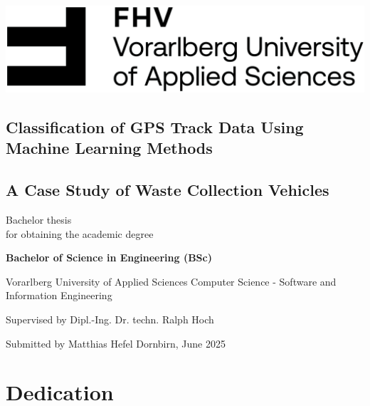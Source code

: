 \documentclass[a4paper,12pt,twoside]{scrreprt}
\begin{document}
\cleardoublepage   %
\thispagestyle{empty}
\begin{titlepage}
  \begin{flushright}
    \includegraphics[width=0.4\linewidth]{Abbildungen/Wort-Bild-Marke-cmyk}
  \end{flushright}
  \begin{flushleft}
    \section*{Classification of GPS Track Data Using Machine Learning Methods}
    \subsection*{A Case Study of Waste Collection Vehicles}
    \vspace{1cm}

    Bachelor thesis\\
    for obtaining the academic degree
    \vspace{0.5cm}

    \textbf{Bachelor of Science in Engineering (BSc)}

    \vspace{1cm}
    Vorarlberg University of Applied Sciences\newline
    Computer Science - Software and Information Engineering

    \vspace{0.5cm}

    Supervised by\newline
    Dipl.-Ing. Dr. techn. Ralph Hoch

    \vspace{0.5cm}

    Submitted by\newline
    Matthias Hefel\newline
    Dornbirn, June 2025
  \end{flushleft}
\end{titlepage}

\newpage

\section*{Dedication}
\end{document}
